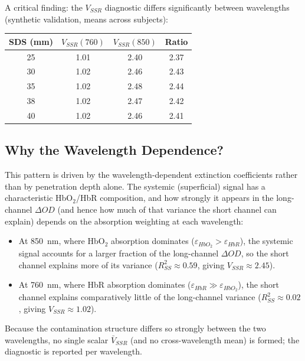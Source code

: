 \documentclass[12pt]{article}
\def\mathrm#1{#1}%
\begin{document}
A critical finding: the $V_{\mathrm{SSR}}$ diagnostic differs significantly between wavelengths (synthetic validation, means across subjects):

\begin{center}
\begin{tabular}{cccc}
\hline
\textbf{SDS (mm)} & $V_{\mathrm{SSR}}(760)$ & $V_{\mathrm{SSR}}(850)$ & \textbf{Ratio} \\
\hline
25 & 1.01 & 2.40 & 2.37 \\
30 & 1.02 & 2.46 & 2.43 \\
35 & 1.02 & 2.48 & 2.44 \\
38 & 1.02 & 2.47 & 2.42 \\
40 & 1.02 & 2.46 & 2.41 \\
\hline
\end{tabular}
\end{center}

\subsection{Why the Wavelength Dependence?}

This pattern is driven by the wavelength-dependent extinction coefficients rather than by penetration depth alone. The systemic (superficial) signal has a characteristic HbO$_2$/HbR composition, and how strongly it appears in the long-channel $\Delta\mathrm{OD}$ (and hence how much of that variance the short channel can explain) depends on the absorption weighting at each wavelength:

\begin{itemize}
\item At 850~nm, where HbO$_2$ absorption dominates ($\varepsilon_{\mathrm{HbO_2}} > \varepsilon_{\mathrm{HbR}}$), the systemic signal accounts for a larger fraction of the long-channel $\Delta\mathrm{OD}$, so the short channel explains more of its variance ($R^2_{\mathrm{SS}} \approx 0.59$, giving $V_{\mathrm{SSR}} \approx 2.45$).
\item At 760~nm, where HbR absorption dominates ($\varepsilon_{\mathrm{HbR}} \gg \varepsilon_{\mathrm{HbO_2}}$), the short channel explains comparatively little of the long-channel variance ($R^2_{\mathrm{SS}} \approx 0.02$, giving $V_{\mathrm{SSR}} \approx 1.02$).
\end{itemize}

Because the contamination structure differs so strongly between the two wavelengths, no single scalar $\bar{V}_{\mathrm{SSR}}$ (and no cross-wavelength mean) is formed; the diagnostic is reported per wavelength.
\end{document}
